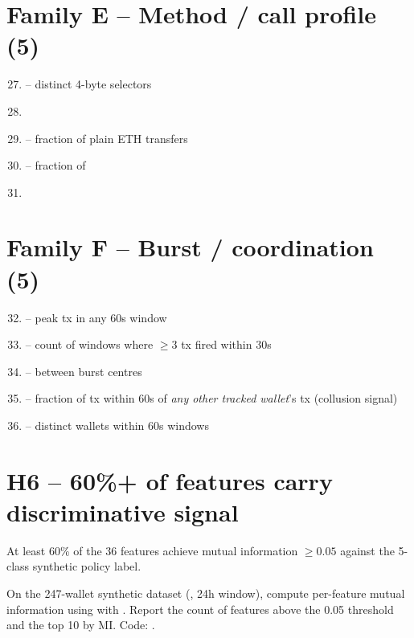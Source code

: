\documentclass[11pt]{article}
\begin{document}
\section{Family E -- Method / call profile (5)}
\begin{enumerate}\setcounter{enumi}{26}
  \item {} -- distinct 4-byte selectors
  \item {}
  \item {} -- fraction of plain ETH transfers
  \item {} -- fraction of 
  \item {}
\end{enumerate}

\section{Family F -- Burst / coordination (5)}
\begin{enumerate}\setcounter{enumi}{31}
  \item {} -- peak tx in any 60s window
  \item {} -- count of windows where $\geq 3$ tx fired
    within 30s
  \item {} -- between burst centres
  \item {} -- fraction of tx within 60s of
    \emph{any other tracked wallet}'s tx (collusion signal)
  \item {} -- distinct wallets within 60s
    windows
\end{enumerate}

\section{H6 -- 60\%+ of features carry discriminative signal}

\begin{hypothesis}
At least 60\% of the 36 features achieve mutual information $\geq 0.05$
against the 5-class synthetic policy label.
\end{hypothesis}

\begin{experiment}
On the 247-wallet synthetic dataset (, 24h window), compute
per-feature mutual information using
 with .
Report the count of features above the 0.05 threshold and the top 10 by MI.
Code: .
\end{experiment}
\end{document}
